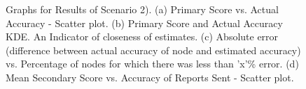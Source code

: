 \documentclass[journal]{IEEEtran}
\begin{document}
\begin{figure}[!ht]
\caption{Graphs for Results of Scenario 2). (a) Primary Score vs. Actual Accuracy - Scatter plot. (b) Primary Score and Actual Accuracy KDE. An Indicator of closeness of estimates. (c) Absolute error (difference between actual accuracy of node and estimated accuracy) vs. Percentage of nodes for which there was less than 'x'\% error. (d) Mean Secondary Score vs. Accuracy of Reports Sent - Scatter plot.}
\label{fig:apdx:sc2}
\centering
{}
\hfill
{}
\end{figure}
\end{document}
